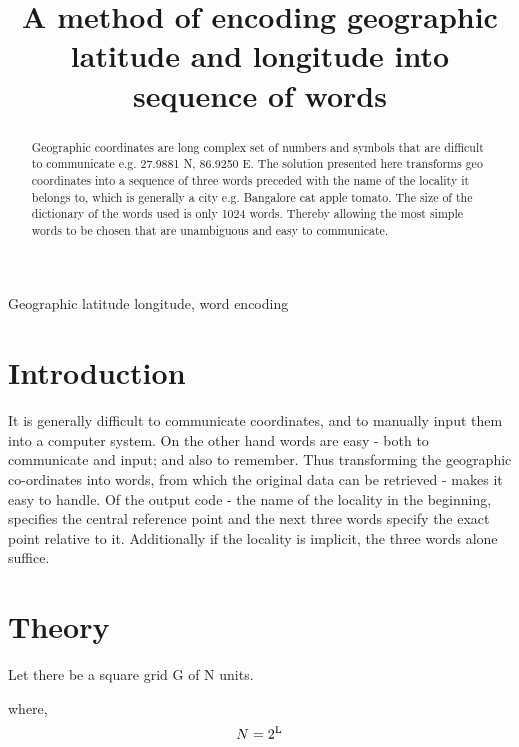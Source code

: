 \documentclass[conference]{IEEEtran}
\begin{document}
\title{A method of encoding geographic latitude and longitude into sequence of words}

\author{
}

\maketitle

\begin{abstract}
Geographic coordinates are long complex set of numbers and symbols that are difficult to communicate e.g. 27.9881 N, 86.9250 E. The solution presented here transforms geo coordinates into a sequence of three words preceded with the name of the locality it belongs to, which is generally a city e.g. Bangalore cat apple tomato. The size of the dictionary of the words used is only 1024 words. Thereby allowing the most simple words to be chosen that are unambiguous and easy to communicate.
\end{abstract}

\begin{IEEEkeywords}
Geographic latitude longitude, word encoding
\end{IEEEkeywords}

\section{Introduction}
It is generally difficult to communicate coordinates, and to manually input them into a computer system. On the other hand words are easy - both to communicate and input; and also to remember. Thus transforming the geographic co-ordinates into words, from which the original data can be retrieved - makes it easy to handle. Of the output code - the name of the locality in the beginning, specifies the central reference point and the next three words specify the exact point relative to it. Additionally if the locality is implicit, the three words alone suffice.
\section{Theory}
Let there be a square grid G of N units.

where, \begin{equation}N = 2\textsuperscript{L} \end{equation}
\end{document}
